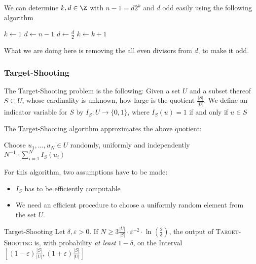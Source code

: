 \newpage

 We can determine $k, d \in \Z$ with $n - 1 = d2^k$ and $d$ odd easily using the following algorithm
\begin{algorithm}
    \caption{Get $d$ and $k$ easily}
    \begin{algorithmic}[1]
        \State $k \gets 1$
        \State $d \gets n - 1$
            \State $d \gets \frac{d}{2}$
            \State $k \gets k + 1$
        \EndWhile
    \end{algorithmic}
\end{algorithm}

What we are doing here is removing the all even divisors from $d$, to make it odd.


\subsubsection{Target-Shooting}
The Target-Shooting problem is the following: Given a set $U$ and a subset thereof $S \subseteq U$, whose cardinality is unknown, how large is the quotient $\frac{|S|}{|U|}$. We define an indicator variable for $S$ by $I_S : U \rightarrow \{0, 1\}$, where $I_S(u) = 1$ if and only if $u \in S$

The Target-Shooting algorithm approximates the above quotient:
\begin{algorithm}
    \caption{Target-Shooting}\label{alg:target-shooting}
    \begin{algorithmic}[1]
            \State Choose $u_1, \ldots, u_N \in U$ randomly, uniformly and independently
            \State \Return $N^{-1} \cdot \sum_{i = 1}^{N} I_S(u_i)$
        \EndProcedure
    \end{algorithmic}
\end{algorithm}

For this algorithm, two assumptions have to be made:
\begin{itemize}
    \item $I_S$ has to be efficiently computable
    \item We need an efficient procedure to choose a uniformly random element from the set $U$.
\end{itemize}

\begin{theorem}[]{Target-Shooting}
    Let $\delta, \varepsilon > 0$. If $N \geq 3 \frac{|U|}{|S|} \cdot \varepsilon^{-2} \cdot \ln\left(\frac{2}{\delta}\right)$, the output of \textsc{Target-Shooting} is, with probability \textit{at least} $1 - \delta$, on the Interval $\left[ (1 - \varepsilon) \frac{|S|}{|U|}, (1 + \varepsilon) \frac{|S|}{|U|} \right]$
\end{theorem}


